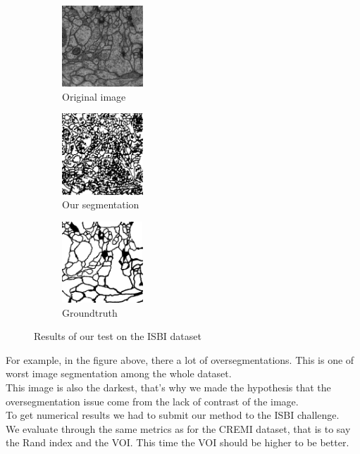 \begin{figure}[!htbp]
    \centering
    \begin{subfigure}[t]{0.31\textwidth}
        \centering
        \includegraphics[height=1.2in]{./images/isbi_orig_2.png}
        \caption{Original image}
    \end{subfigure}%
    \begin{subfigure}[t]{0.31\textwidth}
        \centering
        \includegraphics[height=1.2in]{./images/isbi_out_2.png}
        \caption{Our segmentation}
    \end{subfigure}
    \begin{subfigure}[t]{0.31\textwidth}
        \centering
        \includegraphics[height=1.2in]{./images/isbi_gt_2.png}
        \caption{Groundtruth}
    \end{subfigure}
    \caption{Results of our test on the ISBI dataset}
\end{figure}

For example, in the figure above, there a lot of oversegmentations. This is one of worst image segmentation among the whole dataset.\\
This image is also the darkest, that's why we made the hypothesis that the oversegmentation issue come from the lack of contrast of the image.\\

To get numerical results we had to submit our method to the ISBI challenge.\\
We evaluate through the same metrics as for the CREMI dataset, that is to say the Rand index and the VOI.
This time the VOI should be higher to be better.\\

